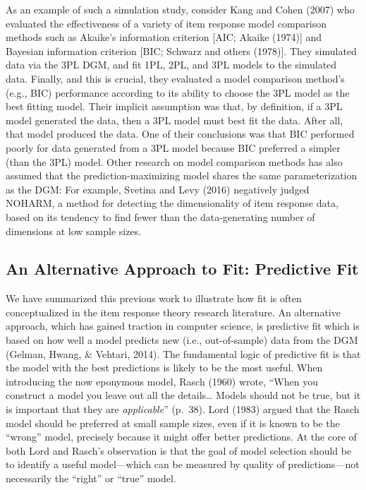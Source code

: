 \documentclass[
  english,
  man,floatsintext]{apa7}
\begin{document}
As an example of such a simulation study, consider Kang and Cohen (2007) who evaluated the effectiveness of a variety of item response model comparison methods such as Akaike's information criterion {[}AIC; Akaike (1974){]} and Bayesian information criterion {[}BIC; Schwarz and others (1978){]}. They simulated data via the 3PL DGM, and fit 1PL, 2PL, and 3PL models to the simulated data. Finally, and this is crucial, they evaluated a model comparison method's (e.g., BIC) performance according to its ability to choose the 3PL model as the best fitting model. Their implicit assumption was that, by definition, if a 3PL model generated the data, then a 3PL model must best fit the data. After all, that model produced the data. One of their conclusions was that BIC performed poorly for data generated from a 3PL model because BIC preferred a simpler (than the 3PL) model. Other research on model comparison methods has also assumed that the prediction-maximizing model shares the same parameterization as the DGM: For example, Svetina and Levy (2016) negatively judged NOHARM, a method for detecting the dimensionality of item response data, based on its tendency to find fewer than the data-generating number of dimensions at low sample sizes.

\hypertarget{an-alternative-approach-to-fit-predictive-fit}{%
\subsection{An Alternative Approach to Fit: Predictive Fit}\label{an-alternative-approach-to-fit-predictive-fit}}

We have summarized this previous work to illustrate how fit is often conceptualized in the item response theory research literature. An alternative approach, which has gained traction in computer science, is predictive fit which is based on how well a model predicts new (i.e., out-of-sample) data from the DGM (Gelman, Hwang, \& Vehtari, 2014). The fundamental logic of predictive fit is that the model with the best predictions is likely to be the most useful. When introducing the now eponymous model, Rasch (1960) wrote, ``When you construct a model you leave out all the details\ldots{} Models should not be true, but it is important that they are \emph{applicable}'' (p.~38). Lord (1983) argued that the Rasch model should be preferred at small sample sizes, even if it is known to be the ``wrong'' model, precisely because it might offer better predictions. At the core of both Lord and Rasch's observation is that the goal of model selection should be to identify a useful model---which can be measured by quality of predictions---not necessarily the ``right'' or ``true'' model.
\end{document}
